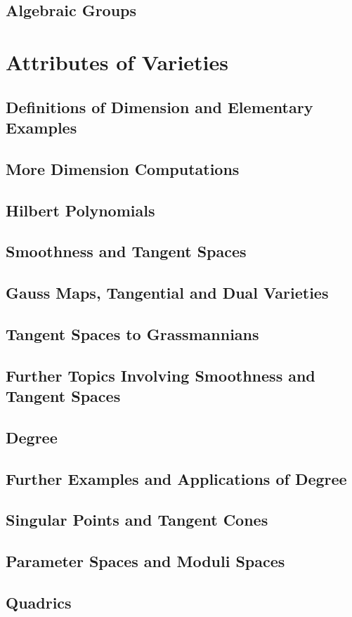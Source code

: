 \documentclass[oneside]{amsbook}
\numberwithin{ex}{chapter}
\begin{document}
\chapter{Algebraic Groups}


\part{Attributes of Varieties}
\chapter{Definitions of Dimension and Elementary Examples}

\chapter{More Dimension Computations}

\chapter{Hilbert Polynomials}

\chapter{Smoothness and Tangent Spaces}

\chapter{Gauss Maps, Tangential and Dual Varieties}

\chapter{Tangent Spaces to Grassmannians}

\chapter{Further Topics Involving Smoothness and Tangent Spaces}

\chapter{Degree}

\chapter{Further Examples and Applications of Degree}

\chapter{Singular Points and Tangent Cones}

\chapter{Parameter Spaces and Moduli Spaces}

\chapter{Quadrics}

\end{document}
